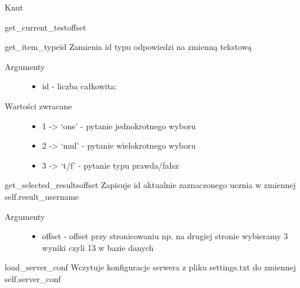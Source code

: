 \documentclass[letterpaper,10pt,polish]{manual}
\begin{document}
\begin{classdesc}{Knut}{}
\begin{methoddesc}{get\_current\_test}{offset}
\begin{description}
\end{description}
\end{methoddesc}

\hypertarget{Knut.Knut.get\_item\_type}{}\begin{methoddesc}{get\_item\_type}{id}
Zamienia id typu odpowiedzi na zmienną tekstową
\begin{description}
\item[Argumenty] \leavevmode\begin{itemize}
\item {} 
id - liczba całkowita:

\end{itemize}

\item[Wartości zwracane] \leavevmode\begin{itemize}
\item {} 
1 -\textgreater{} `one' - pytanie jednokrotnego wyboru

\item {} 
2 -\textgreater{} `mul' - pytanie wielokrotnego wyboru

\item {} 
3 -\textgreater{} `t/f' - pytanie typu prawda/fałsz

\end{itemize}

\end{description}
\end{methoddesc}

\hypertarget{Knut.Knut.get\_selected\_results}{}\begin{methoddesc}{get\_selected\_results}{offset}
Zapisuje id aktualnie zaznaczonego ucznia w zmiennej self.result\_username
\begin{description}
\item[Argumenty] \leavevmode\begin{itemize}
\item {} 
offset - offset przy stronicowaniu np. na drugiej stronie wybieramy 3 wyniki czyli 13 w bazie danych

\end{itemize}

\end{description}
\end{methoddesc}

\hypertarget{Knut.Knut.load\_server\_conf}{}\begin{methoddesc}{load\_server\_conf}{}
Wczytuje konfiguracje serwera z pliku settings.txt do zmiennej self.server\_conf
\end{methoddesc}


\end{classdesc}
\end{document}
